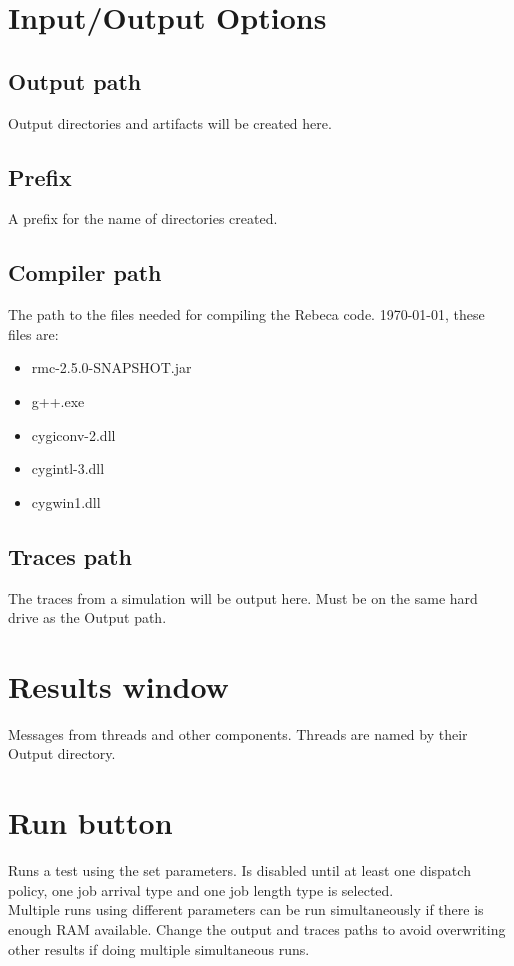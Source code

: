 \documentclass[11pt,oneside,a4paper]{article}
\begin{document}
\section{Input/Output Options}
\subsection{Output path}
Output directories and artifacts will be created here. 
\subsection{Prefix}
A prefix for the name of directories created.
\subsection{Compiler path}
The path to the files needed for compiling the Rebeca code. \today, these files are:
\begin{itemize}
\item rmc-2.5.0-SNAPSHOT.jar
\item g++.exe
\item cygiconv-2.dll
\item cygintl-3.dll
\item cygwin1.dll
\end{itemize}
\subsection{Traces path}
The traces from a simulation will be output here. Must be on the same hard drive as the Output path.

\section{Results window}
Messages from threads and other components. Threads are named by their Output directory.

\section{Run button}
Runs a test using the set parameters. Is disabled until at least one dispatch policy, one job arrival type and one job length type is selected.\\
Multiple runs using different parameters can be run simultaneously if there is enough RAM available. Change the output and traces paths to avoid overwriting other results if doing multiple simultaneous runs.
\end{document}
